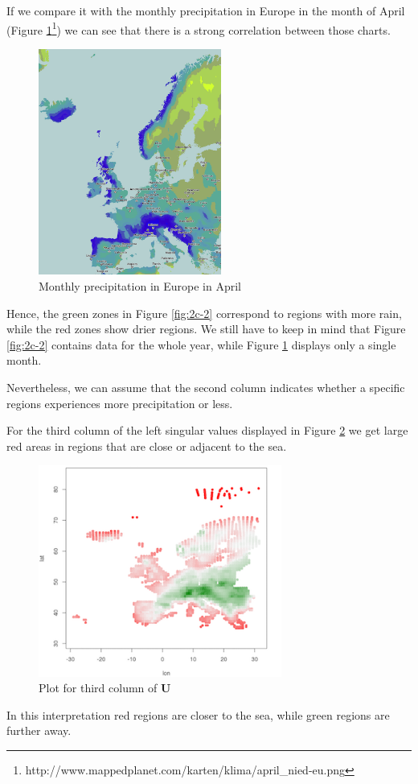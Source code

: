\documentclass{support/acm_proc_article-sp}
\begin{document}
    If we compare it with the monthly precipitation in Europe in the month of April
    (Figure \ref{fig:april-precip-europe}\footnote{http://www.mappedplanet.com/karten/klima/april\_nied-eu.png}) we
    can see that there is a strong correlation between those charts.
    \begin{figure}[!htbp]
        \centering
        \includegraphics[width=6cm]{images/april-precip-europe.png}
        \caption{Monthly precipitation in Europe in April}
        \label{fig:april-precip-europe}
    \end{figure}
    Hence, the green zones in Figure \ref{fig:2c-2} correspond to regions with more rain, while the red zones show
    drier regions.
    We still have to keep in mind that Figure \ref{fig:2c-2} contains data for the whole year, while Figure \ref{fig:april-precip-europe}
    displays only a single month.

    Nevertheless, we can assume that the second column indicates whether a specific regions experiences more
    precipitation or less.

    For the third column of the left singular values displayed in Figure \ref{fig:2c-3} we get large red areas in regions
    that are close or adjacent to the sea.
    \begin{figure}[!htbp]
        \centering
        \includegraphics[width=8cm]{images/2c-3.png}
        \caption{Plot for third column of $\mathbf{U}$}
        \label{fig:2c-3}
    \end{figure}
    In this interpretation red regions are closer to the sea, while green regions are further away.
\end{document}
